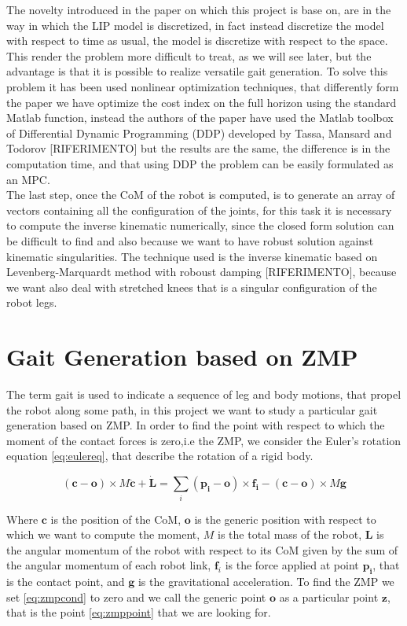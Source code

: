\documentclass[a4paper]{article}
\begin{document}
The novelty introduced in the paper on which this project is base on, are in the way in which the LIP model is discretized, in fact instead discretize the model with respect to time as usual, the model is discretize with respect to the space. This render the problem more difficult to treat, as we will see later, but the advantage is that it is possible to realize versatile gait generation. To solve this problem it has been used nonlinear optimization techniques, that differently form the paper we have optimize the cost index on the full horizon using the standard Matlab function, instead the authors of the paper have used the Matlab toolbox of Differential Dynamic Programming (DDP) developed by Tassa, Mansard and Todorov [RIFERIMENTO] but the results are the same, the difference is in the computation time, and that using DDP the problem can be easily formulated as an MPC.\\
The last step, once the CoM of the robot is computed, is to generate an array of vectors containing all the configuration of the joints, for this task it is necessary to compute the inverse kinematic numerically, since the closed form solution can be difficult to find and also because we want to have robust solution against kinematic singularities. The technique used is the inverse kinematic based on Levenberg-Marquardt method with roboust damping [RIFERIMENTO], because we want also deal with stretched knees that is a singular configuration of the robot legs.   


\section{Gait Generation based on ZMP}


The term gait is used to indicate a sequence of leg and body motions, that propel the robot along some path, in this project we want to study a particular gait generation based on ZMP. In order to find the point with respect to which the moment of the contact forces is zero,i.e the ZMP, we consider the Euler's rotation equation \ref{eq:eulereq}, that describe the rotation of a rigid body.

\begin{equation}
(\pmb{c}-\pmb{o})\times M \ddot{\pmb{c}}+\dot{\pmb{L}} = \sum_i{(\pmb{p_i}-\pmb{o})}\times \pmb{f_i}-(\pmb{c}-\pmb{o})\times M\pmb{g}
\label{eq:eulereq}
\end{equation}   

Where $\pmb{c}$ is the position of the CoM, $\pmb{o}$ is the generic position with respect to which we want to compute the moment, $M$ is the total mass of the robot, $\pmb{L}$ is the angular momentum of the robot with respect to its CoM given by the sum of the angular momentum of each robot link, $\pmb{f}_i$ is the force applied at point $\pmb{p_i}$, that is the contact point, and $\pmb{g}$ is the gravitational acceleration. To find the ZMP we set \ref{eq:zmpcond} to zero and we call the generic point $\pmb{o}$ as a particular point $\pmb{z}$, that is the point \ref{eq:zmppoint} that we are looking for.
\end{document}
